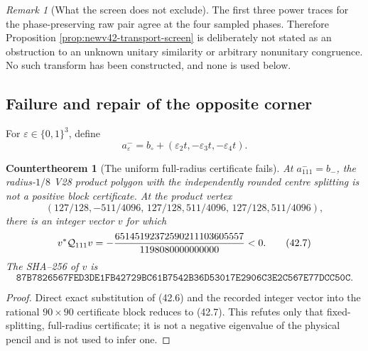 \documentclass[11pt,oneside]{article}
\newtheorem{countertheorem}[theorem]{Countertheorem}
\theoremstyle{definition}
\theoremstyle{remark}
\newtheorem{remark}[theorem]{Remark}
\begin{document}
\begin{remark}[What the screen does not exclude]
The first three power traces for the phase-preserving raw pair
agree at the four sampled phases.  Therefore Proposition
\ref{prop:newv42-transport-screen} is deliberately not stated as
an obstruction to an unknown unitary similarity or arbitrary
nonunitary congruence.  No such transform has been constructed, and
none is used below.
\end{remark}

\subsection{Failure and repair of the opposite corner}

For \(\varepsilon\in\{0,1\}^3\), define
\[
 a_\varepsilon^-=
 b_\circ+(\varepsilon_2t,-\varepsilon_3t,
                    -\varepsilon_4t).                 \tag{42.5}
\]

\begin{countertheorem}[The uniform full-radius certificate fails]
\label{cth:newv42-isotropic-failure}
At \(a_{111}^-=b_-\), the radius-\(1/8\) V28 product polygon with
the independently rounded centre splitting is not a positive
block certificate.  At the product vertex
\[
 (127/128,-511/4096,\,
   127/128,511/4096,\,
   127/128,511/4096),                                  \tag{42.6}
\]
there is an integer vector \(v\) for which
\[
 v^*{\cal Q}_{111}v
 =-\frac{65145192372590211103605557}
 {1198080000000000}<0.                                 \tag{42.7}
\]
The SHA--256 of \(v\) is
\[
\texttt{87B7826567FED3DE1FB42729BC61B7542B36D53017E2906C3E2C567E77DCC50C}.
\]
\end{countertheorem}

\begin{proof}
Direct exact substitution of (42.6) and the recorded integer vector
into the rational \(90\times90\) certificate block reduces to
(42.7).  This refutes only that fixed-splitting, full-radius
certificate; it is not a negative eigenvalue of the physical
pencil and is not used to infer one.
\end{proof}
\end{document}

